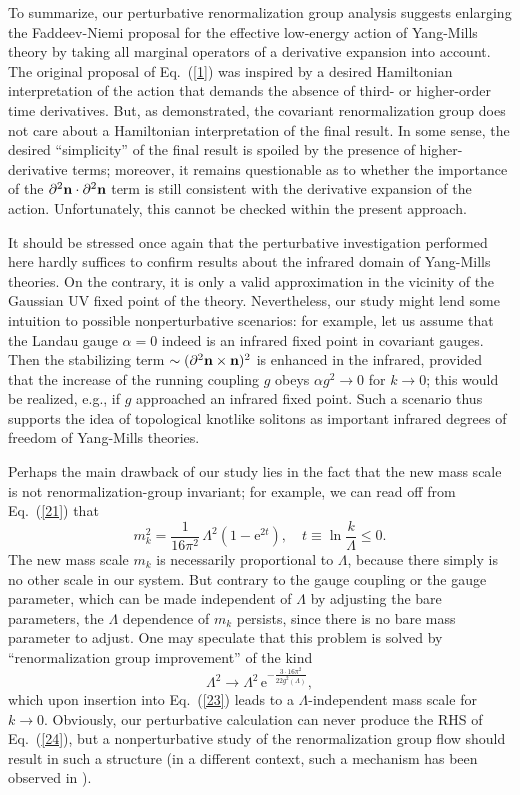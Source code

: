\documentclass[a4paper,12pt]{article}
\newcommand{\E}{\text{e}}
\newcommand{\re}[1]{~(\ref{#1})}
\begin{document}
To summarize, our perturbative renormalization group analysis suggests
enlarging the Faddeev-Niemi proposal for the effective low-energy
action of Yang-Mills theory by taking all marginal operators of a
derivative expansion into account. The original proposal of Eq.\re{1}
was inspired by a desired Hamiltonian interpretation of the action
that demands the absence of third- or higher-order time
derivatives. But, as demonstrated, the covariant renormalization group
does not care about a Hamiltonian interpretation of the final
result. In some sense, the desired ``simplicity'' of the final result
is spoiled by the presence of higher-derivative terms; moreover, it
remains questionable as to whether the importance of the
$\partial^2\mathbf{n}\cdot\partial^2\mathbf{n}$ term is still consistent with the
derivative expansion of the action. Unfortunately, this cannot be
checked within the present approach.

It should be stressed once again that the perturbative investigation
performed here hardly suffices to confirm results about the infrared
domain of Yang-Mills theories. On the contrary, it is only a valid
approximation in the vicinity of the Gaussian UV fixed point of the
theory. Nevertheless, our study might lend some intuition to 
possible nonperturbative scenarios: for example, let us assume that
the Landau gauge $\alpha=0$ indeed is an infrared fixed point in
covariant gauges. Then the stabilizing term $\sim
(\partial^2\mathbf{n}\times\mathbf{n})^2$ is enhanced in the infrared, provided that
the increase of the running coupling $g$ obeys $\alpha g^2\to 0$ for
$k\to 0$; this would be realized, e.g., if $g$ approached an infrared
fixed point. Such a scenario thus supports the idea of topological
knotlike solitons as important infrared degrees of freedom of
Yang-Mills theories.

Perhaps the main drawback of our study lies in the fact that the
new mass scale is not renormalization-group invariant; for example, we
can read off from Eq.\re{21} that
\begin{equation}
m_k^2=\frac{1}{16\pi^2}\, \Lambda^2 (1-\E^{2t}), \quad
t\equiv \ln \frac{k}{\Lambda}\leq0. \label{23}
\end{equation}
The new mass scale $m_k$ is necessarily proportional to $\Lambda$,
because there simply is no other scale in our system. But contrary to
the gauge coupling or the gauge parameter, which can be made
independent of $\Lambda$ by adjusting the bare parameters, the
$\Lambda$ dependence of $m_k$ persists, since there is no bare mass
parameter to adjust. One may speculate that this problem is solved by
``renormalization group improvement'' of the kind
\begin{equation}
\Lambda^2\to \Lambda^2\, \E^{-\frac{3\cdot 16\pi^2}{22 g^2(\Lambda)}},
\label{24}
\end{equation}
which upon insertion into Eq.\re{23} leads to a $\Lambda$-independent
mass scale for $k\to 0$. Obviously, our perturbative calculation can
never produce the RHS of Eq.\re{24}, but a nonperturbative study of
the renormalization group flow should result in such a structure (in a
different context, such a mechanism has been observed in 
\cite{Ellwanger:1998wv}).
\end{document}
